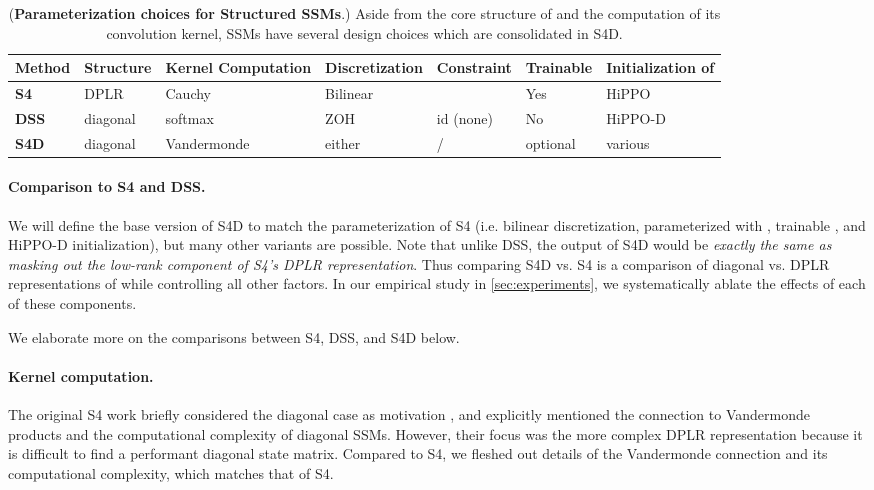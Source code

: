 \documentclass{article}
\newcommand{\para}[1]{\paragraph{#1}}
\begin{document}
\begin{table}[!ht]
  \small
  \caption{(\textbf{Parameterization choices for Structured SSMs}.) Aside from the core structure of  and the computation of its convolution kernel, SSMs have several design choices which are consolidated in S4D.}
  \begin{tabular}{@{}lllllll@{}}
    \toprule
    Method       & Structure & Kernel Computation & Discretization & Constraint    & Trainable  & Initialization of  \\
    \midrule
    \textbf{S4}  & DPLR      & Cauchy    & Bilinear       &                      & Yes                    & HiPPO                          \\
    \textbf{DSS} & diagonal  & softmax          & ZOH            & id (none)                      & No                     & HiPPO-D                        \\
    \textbf{S4D} & diagonal  & Vandermonde      & either        &  /  & optional                 & various                        \\
    \bottomrule
  \end{tabular}
  \label{tab:parameterization}
\end{table}


\para{Comparison to S4 and DSS.}


We will define the base version of S4D to match the parameterization of S4 (i.e. bilinear discretization,  parameterized with , trainable , and HiPPO-D initialization), but many other variants are possible.
Note that unlike DSS, the output of S4D would be \emph{exactly the same as masking out the low-rank component of S4's DPLR representation}.
Thus comparing S4D vs. S4 is a comparison of diagonal vs. DPLR representations of  while controlling all other factors.
In our empirical study in \cref{sec:experiments},
we systematically ablate the effects of each of these components.

We elaborate more on the comparisons between S4, DSS, and S4D below.


\para{Kernel computation.}

The original S4 work briefly considered the diagonal case as motivation \citep[Section 3.1]{gu2022efficiently}, and explicitly mentioned the connection to Vandermonde products and the computational complexity of diagonal SSMs.
However, their focus was the more complex DPLR representation because it is difficult to find a performant diagonal state matrix.
Compared to S4, we fleshed out details of the Vandermonde connection and its computational complexity, which matches that of S4.
\end{document}
